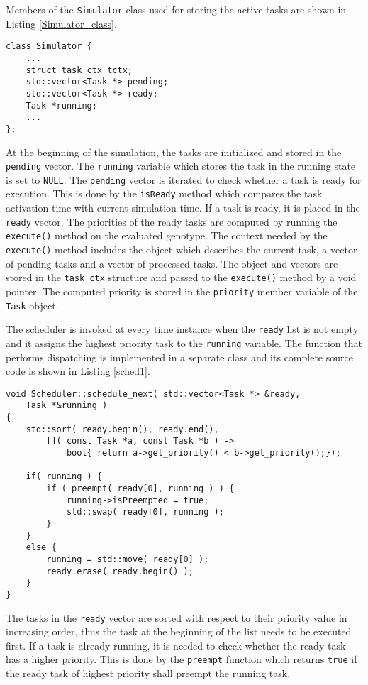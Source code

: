Members of the \texttt{Simulator} class used for storing the active tasks are shown in Listing \ref{Simulator_class}.
\begin{lstlisting}[frame=none, label={Simulator_class}, caption={Members of \texttt{Simulator} class which store the active tasks.}, captionpos=b]
class Simulator {
	...
    struct task_ctx tctx;
	std::vector<Task *> pending;
	std::vector<Task *> ready;
	Task *running;
	...
};
\end{lstlisting}
At the beginning of the simulation, the tasks are initialized and stored in the \texttt{pending} vector.
The \texttt{running} variable which stores the task in the running state is set to \texttt{NULL}.
The \texttt{pending} vector is iterated to check whether a task is ready for execution.
This is done by the \texttt{isReady} method which compares the task activation time with current simulation time.
If a task is ready, it is placed in the \texttt{ready} vector.
The priorities of the ready tasks are computed by running the \texttt{execute()} method on the evaluated genotype.
The context needed by the \texttt{execute()} method includes the object which describes the current task, a vector of pending tasks and a vector of processed tasks.
The object and vectors are stored in the \texttt{task\_ctx} structure and passed to the \texttt{execute()} method by a void pointer.
The computed priority is stored in the \texttt{priority} member variable of the \texttt{Task} object.

The scheduler is invoked at every time instance when the \texttt{ready} list is not empty and it assigns the highest priority task to the \texttt{running} variable.
The function that performs dispatching is implemented in a separate class and its complete source code is shown in Listing \ref{sched1}.
\begin{lstlisting}[frame=none, label={sched1}, caption={The \texttt{schedule\_next} method.}, captionpos=b]
void Scheduler::schedule_next( std::vector<Task *> &ready, 
	Task *&running )
{
    std::sort( ready.begin(), ready.end(),
        []( const Task *a, const Task *b ) -> 
            bool{ return a->get_priority() < b->get_priority();});

    if( running ) {
        if ( preempt( ready[0], running ) ) {
            running->isPreempted = true;
            std::swap( ready[0], running );
        }
    }
    else {
        running = std::move( ready[0] );
        ready.erase( ready.begin() );
    }
}
\end{lstlisting}
The tasks in the \texttt{ready} vector are sorted with respect to their priority value in increasing order, thus the task at the beginning of the list needs to be executed first.
If a task is already running, it is needed to check whether the ready task has a higher priority.
This is done by the \texttt{preempt} function which returns \texttt{true} if the ready task of highest priority shall preempt the running task.

